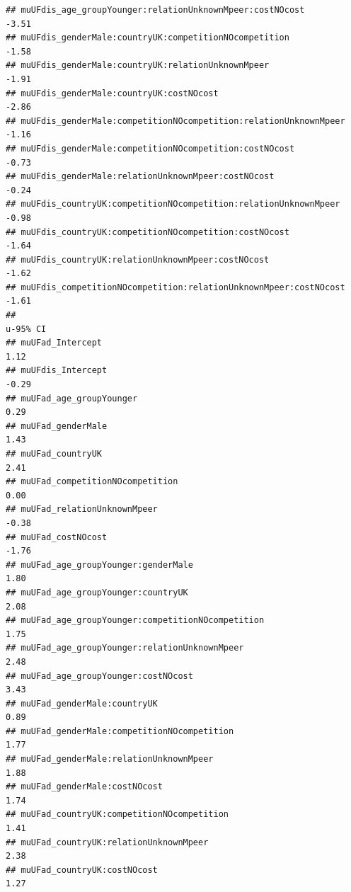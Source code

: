 \documentclass[
]{article}
\begin{document}
\begin{verbatim}
## muUFdis_age_groupYounger:relationUnknownMpeer:costNOcost                  -3.51
## muUFdis_genderMale:countryUK:competitionNOcompetition                     -1.58
## muUFdis_genderMale:countryUK:relationUnknownMpeer                         -1.91
## muUFdis_genderMale:countryUK:costNOcost                                   -2.86
## muUFdis_genderMale:competitionNOcompetition:relationUnknownMpeer          -1.16
## muUFdis_genderMale:competitionNOcompetition:costNOcost                    -0.73
## muUFdis_genderMale:relationUnknownMpeer:costNOcost                        -0.24
## muUFdis_countryUK:competitionNOcompetition:relationUnknownMpeer           -0.98
## muUFdis_countryUK:competitionNOcompetition:costNOcost                     -1.64
## muUFdis_countryUK:relationUnknownMpeer:costNOcost                         -1.62
## muUFdis_competitionNOcompetition:relationUnknownMpeer:costNOcost          -1.61
##                                                                        u-95% CI
## muUFad_Intercept                                                           1.12
## muUFdis_Intercept                                                         -0.29
## muUFad_age_groupYounger                                                    0.29
## muUFad_genderMale                                                          1.43
## muUFad_countryUK                                                           2.41
## muUFad_competitionNOcompetition                                            0.00
## muUFad_relationUnknownMpeer                                               -0.38
## muUFad_costNOcost                                                         -1.76
## muUFad_age_groupYounger:genderMale                                         1.80
## muUFad_age_groupYounger:countryUK                                          2.08
## muUFad_age_groupYounger:competitionNOcompetition                           1.75
## muUFad_age_groupYounger:relationUnknownMpeer                               2.48
## muUFad_age_groupYounger:costNOcost                                         3.43
## muUFad_genderMale:countryUK                                                0.89
## muUFad_genderMale:competitionNOcompetition                                 1.77
## muUFad_genderMale:relationUnknownMpeer                                     1.88
## muUFad_genderMale:costNOcost                                               1.74
## muUFad_countryUK:competitionNOcompetition                                  1.41
## muUFad_countryUK:relationUnknownMpeer                                      2.38
## muUFad_countryUK:costNOcost                                                1.27

\end{verbatim}
\end{document}
